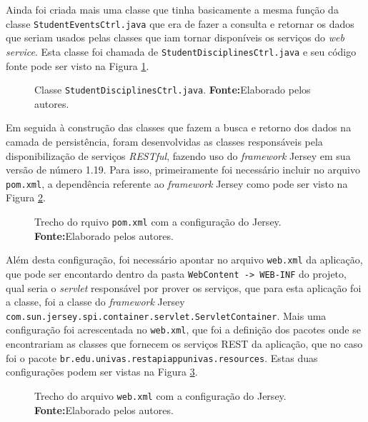 	\par Ainda foi criada mais uma classe que tinha basicamente a mesma função da
classe \texttt{StudentEventsCtrl.java} que era de fazer a consulta e retornar
os dados que seriam usados pelas classes que iam tornar disponíveis os serviços
do \textit{web service}. Esta classe foi chamada de
\texttt{StudentDisciplinesCtrl.java} e seu código fonte pode ser visto na
Figura \ref{fig:desws23}.

	\begin{figure}[h!]
		
		\caption[Classe StudentDisciplinesCtrl.java]{Classe
		\texttt{StudentDisciplinesCtrl.java}.
		\textbf{Fonte:}Elaborado pelos autores.}
		\label{fig:desws23}
	\end{figure}
	
	\par Em seguida à construção das classes que fazem a busca e retorno dos dados
na camada de persistência, foram desenvolvidas as classes responsáveis pela
disponibilização de serviços \textit{RESTful}, fazendo uso do
\textit{framework} Jersey em sua versão de número {1.19}. Para isso,
primeiramente foi necessário incluir no arquivo \texttt{pom.xml}, a dependência
referente ao \textit{framework} Jersey como pode ser visto na Figura
\ref{fig:desws24}.

	\begin{figure}[h!]
		
		\caption[Trecho do rquivo pom.xml com a configuração do
		Jersey]{Trecho do rquivo \texttt{pom.xml} com a configuração do
		Jersey.
		\textbf{Fonte:}Elaborado pelos autores.}
		\label{fig:desws24}
	\end{figure}
	
	\pagebreak

	\par Além desta configuração, foi necessário apontar no arquivo
\texttt{web.xml} da aplicação, que pode ser encontardo dentro da pasta
\texttt{WebContent -> WEB-INF} do projeto, qual seria o \textit{servlet}
responsável por prover os serviços, que para esta aplicação foi a classe, foi
a classe do \textit{framework} Jersey
\texttt{com.sun.jersey.spi.container.servlet.ServletContainer}. Mais uma
configuração foi acrescentada no \texttt{web.xml}, que foi a definição dos
pacotes onde se encontrariam as classes que fornecem os serviços REST da
aplicação, que no caso foi o pacote
\texttt{br.edu.univas.restapiappunivas.resources}. Estas duas configurações
podem ser vistas na Figura \ref{fig:desws25}.

	\begin{figure}[h!]
		
		\caption[Trecho do arquivo web.xml com a configuração do
		Jersey]{Trecho do arquivo \texttt{web.xml} com a configuração do
		Jersey.
		\textbf{Fonte:}Elaborado pelos autores.}
		\label{fig:desws25}
	\end{figure}
	
